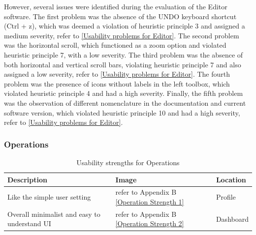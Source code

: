 \documentclass[conference,onecolumn]{IEEEtran}
\begin{document}
            However, several issues were identified during the evaluation of the Editor software. The first problem was the absence of the UNDO keyboard shortcut (Ctrl + z), which was deemed a violation of heuristic principle 3 and assigned a medium severity, refer to \tablename{ \ref{Usability problems for Editor}}. The second problem was the horizontal scroll, which functioned as a zoom option and violated heuristic principle 7, with a low severity. The third problem was the absence of both horizontal and vertical scroll bars, violating heuristic principle 7 and also assigned a low severity, refer to \tablename{ \ref{Usability problems for Editor}}. The fourth problem was the presence of icons without labels in the left toolbox, which violated heuristic principle 4 and had a high severity. Finally, the fifth problem was the observation of different nomenclature in the documentation and current software version, which violated heuristic principle 10 and had a high severity, refer to \tablename{ \ref{Usability problems for Editor}}.
        
        \subsubsection{Operations}\hfill

            \begin{table}[H]	
                \begin{center}
                    \begin{tabular}[H]{ |m{8cm}|m{5cm}|m{4cm}|}
                        \hline
                        \textbf{Description}&\textbf{Image} &\textbf{Location}  \\ \hline
                        Like the simple user setting 	                &refer to Appendix B \figurename{\ref{Operation Strength 1}} &Profile  \\ \hline
                        Overall minimalist and easy to understand UI    &refer to Appendix B \figurename{\ref{Operation Strength 2}} &Dashboard  \\ 
                        \hline
                    \end{tabular}
                \end{center}
                \caption{Usability strengths for Operations}
                \label{Usability strengths for Operations}
            \end{table}
            
\end{document}
